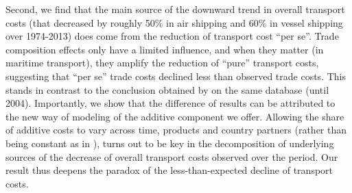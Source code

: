 \documentclass[a4paper,11pt]{article}
\begin{document}
Second, we find that the main source of the downward trend in overall transport costs (that decreased by roughly 50\% in air shipping and 60\% in vessel shipping over 1974-2013) does come from the reduction of transport cost ``per se''. Trade composition effects only have a limited influence, and when they matter (in maritime transport), they amplify the reduction of ``pure'' transport costs, suggesting that ``per se'' trade costs declined less than observed trade costs. This stands in contrast to the conclusion obtained by \cite{hummels2007} on the same database (until 2004). Importantly, we show that the difference of results can be attributed to the new way of modeling of the additive component we offer. Allowing the share of additive costs to vary  across time, products and country partners (rather than being constant as in \citealp{hummels2007}), turns out to be key in the decomposition of underlying sources of the decrease of overall transport costs observed over the period. Our result thus deepens the paradox of the less-than-expected decline of transport costs.\smallskip
\end{document}

